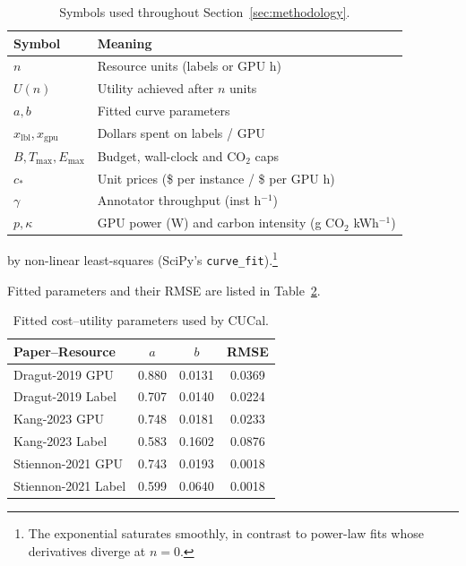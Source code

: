 \documentclass[11pt]{article}
\begin{document}
\begin{table}[htbp]
  \centering
  \caption{Symbols used throughout Section~\ref{sec:methodology}.}
  \begin{tabular}{@{}ll@{}}
    \toprule
    Symbol & Meaning \\ \midrule
    $n$            & Resource units (labels or GPU h) \\
    $U(n)$         & Utility achieved after $n$ units \\
    $a,b$          & Fitted curve parameters \\
    $x_{\mathrm{lbl}},x_{\mathrm{gpu}}$ & Dollars spent on labels / GPU \\
    $B,T_{\max},E_{\max}$ & Budget, wall-clock and CO$_2$ caps \\
    $c_{\ast}$     & Unit prices (\$ per instance / \$ per GPU h) \\
    $\gamma$       & Annotator throughput (inst h$^{-1}$) \\
    $p,\kappa$     & GPU power (W) and carbon intensity (g CO$_2$ kWh$^{-1}$) \\
    \bottomrule
  \end{tabular}
  \label{tab:notation}
\end{table}

by non-linear least-squares (SciPy’s
\texttt{curve\_fit}).\footnote{The exponential saturates smoothly,
in contrast to power-law fits whose derivatives diverge at \(n{=}0\).}

Fitted parameters and their RMSE are listed in Table~\ref{tab:curves}.

\begin{table}[ht]
  \centering
  \caption{Fitted cost–utility parameters used by CUCal.}
  \label{tab:curves}
  \begin{tabular}{lccc}
    \toprule
    Paper–Resource            & $a$     & $b$      & RMSE  \\
    \midrule
    Dragut-2019 GPU           & 0.880   & 0.0131   & 0.0369 \\
    Dragut-2019 Label         & 0.707   & 0.0140   & 0.0224 \\
    Kang-2023 GPU             & 0.748   & 0.0181   & 0.0233 \\
    Kang-2023 Label           & 0.583   & 0.1602   & 0.0876 \\
    Stiennon-2021 GPU         & 0.743   & 0.0193   & 0.0018 \\
    Stiennon-2021 Label       & 0.599   & 0.0640   & 0.0018 \\
    \bottomrule
  \end{tabular}
\end{table}
\end{document}
